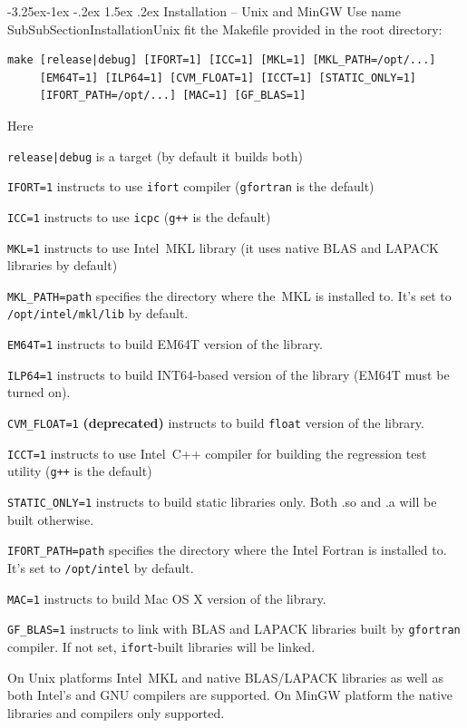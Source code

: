 \documentclass[12pt,letterpaper]{article}
\makeatletter
\renewcommand\subsubsection{\@startsection{subsubsection}{3}{0mm}%
                                     {-3.25ex\@plus -1ex \@minus -.2ex}%
                                     {1.5ex \@plus .2ex}%
                                     {\normalfont\normalsize\bfseries\sffamily}}
\makeatother
\begin{document}
\subsubsection{Installation -- Unix and MinGW}
Use%
\pdfdest name {SubSubSectionInstallationUnix} fit{}
the Makefile provided in the root directory:
\begin{Verbatim}
make [release|debug] [IFORT=1] [ICC=1] [MKL=1] [MKL_PATH=/opt/...] 
     [EM64T=1] [ILP64=1] [CVM_FLOAT=1] [ICCT=1] [STATIC_ONLY=1]
     [IFORT_PATH=/opt/...] [MAC=1] [GF_BLAS=1]
\end{Verbatim}
Here
\begin{compactitem}
\item \verb'release|debug' is a target (by default it builds both)
\item \verb'IFORT=1' instructs to use \verb"ifort"
compiler (\verb'gfortran' is the default)
\item \verb'ICC=1' instructs to use \verb"icpc"
(\verb'g++' is the default)
\item \verb'MKL=1' instructs to use Intel~MKL library (it uses
  native BLAS and LAPACK libraries by default)
\item \verb'MKL_PATH=path' specifies the directory where the~MKL is installed to.
It's set to \verb'/opt/intel/mkl/lib' by default.
\item \verb'EM64T=1' instructs to build EM64T version of the library.
\item \verb'ILP64=1' instructs to build INT64-based version of the library (EM64T must be turned on).
\item \verb'CVM_FLOAT=1' \textbf{(deprecated)} instructs to build \verb'float' version of the library.
\item \verb'ICCT=1' instructs to use Intel~C++ compiler for building the
regression test utility (\verb'g++' is the default)
\item \verb'STATIC_ONLY=1' instructs to build static libraries only.
Both .so and .a will be built otherwise.
\item \verb'IFORT_PATH=path' specifies the directory where the Intel Fortran is installed to. 
It's set to \verb"/opt/intel" by default.
\item \verb'MAC=1' instructs to build Mac OS X version of the library.
\item \verb'GF_BLAS=1' instructs to link with BLAS and LAPACK libraries built by 
\verb'gfortran' compiler. If not set, \verb'ifort'-built libraries will be linked.
\end{compactitem}
On Unix platforms Intel~MKL and native BLAS/LAPACK libraries as well
as both Intel's and GNU compilers are supported. On MinGW platform the native libraries and
compilers only supported.
\end{document}
